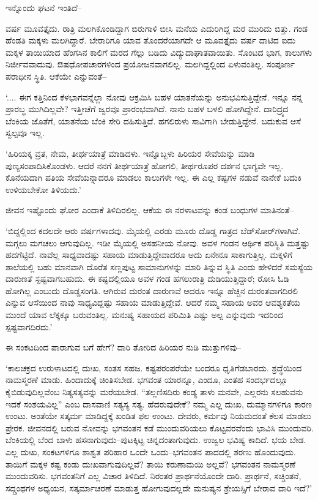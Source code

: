 ಇನ್ನೊಂದು ಘಟನೆ ಇಂತಿದೆ–

\vskip 2pt

ವರ್ಷ ಮೂವತ್ತೈದು. ರಾತ್ರಿ ಮಲಗಿಕೊಂಡಿದ್ದಾಗ ಬಿರುಗಾಳಿ ಬೀಸಿ ಮನೆಯ ಎದುರಿಗಿದ್ದ ಮರ ಮುರಿದು ಬಿತ್ತು. ಗಂಡ ಹೆಂಡತಿ ಮಕ್ಕಳು ಮಲಗಿದ್ದಾರೆ. ಬೇರಾರಿಗೂ ಯಾವ ತೊಂದರೆ\-ಯಾಗದೇ ಆ ಮೂವತ್ತೈದು ವರ್ಷ ದಾಟಿದ ಐದು ಮಕ್ಕಳ ತಾಯಿಯಾದ ಹೆಂಗಸಿನ ಕಾಲಿಗೆ ಮರದ ಗೆಲ್ಲು ಬಡಿದು ವಿದ್ಯುದಾಘಾತವಾಯಿತು. ಸೊಂಟದ ಭಾಗ, ಕಾಲುಗಳು ನಿರ್ಜೀವವಾದುವು. ಔಷಧೋಪಚಾರಗಳಿಂದ ಪ್ರಯೋಜನವಾಗಲಿಲ್ಲ. ಮಲಗಿದ್ದಲ್ಲಿಂದ ಏಳುವಂತಿಲ್ಲ. ಸಂಪೂರ್ಣ ಪರಾಧೀನ ಸ್ಥಿತಿ. ಆಕೆಯೇ ಎನ್ನುವಂತೆ–

\vskip 2pt

‘.... ಈಗ ಕತ್ತಿನಿಂದ ಕೆಳಭಾಗವನ್ನೆಲ್ಲಾ ನೋವು ಆಕ್ರಮಿಸಿ ಬಹಳ ಯಾತನೆಯನ್ನು ಅನುಭವಿಸುತ್ತಿದ್ದೇನೆ. ಇನ್ನೂ ನನ್ನ ಪ್ರಾರಬ್ಧ ಮುಗಿದಿಲ್ಲವೇ? ಇತ್ತೀಚೆಗೆ ಜ್ವರವೂ ಪ್ರಾರಂಭವಾಗಿದೆ. ನಾನು ಬಹಳ ಬಳಲಿ ಹೋಗಿದ್ದೇನೆ. ದಾರಿದ್ರ್ಯದ ಬೆಂಕಿಯ ಜೊತೆಗೆ, ಯಾತನೆಯ ಬೆಂಕಿ ಸೇರಿ ದಹಿಸುತ್ತಿದೆ. ಹಗಲಿರುಳು ಸಾವಿಗಾಗಿ ಬೇಡುತ್ತಿದ್ದೇನೆ. ಬದುಕುವ ಆಸೆ ಸ್ವಲ್ಪವೂ ಇಲ್ಲ.

‘ಹಿರಿಯಕ್ಕ ವ್ರತ, ನೇಮ, ತೀರ್ಥಯಾತ್ರೆ ಮಾಡಿದಳು. ಇನ್ನೊಬ್ಬಳು ಹಿರಿಯರ ಸೇವೆಯನ್ನು ಮಾಡಿ ಪುಣ್ಯಸಂಪಾದಿಸಿಕೊಂಡಳು. ಆದರೆ ನನಗೆ ತೀರ್ಥಯಾತ್ರೆ ಹೋಗಲಿ, ತೀರ್ಥರೂಪರ ದರ್ಶನ ಭಾಗ್ಯವೇ ಇಲ್ಲ. ಕೊನೆಯದಾಗಿ ಪತಿಯ ಸೇವೆಯನ್ನಾದರೂ ಮಾಡಲು ಕಾಲುಗಳೇ ಇಲ್ಲ. ಈ ಎಲ್ಲ ಕಷ್ಟಗಳ ನಡುವೆ ನಾನೇಕೆ ಬದುಕಿ ಉಳಿಯಬೇಕೋ ತಿಳಿಯದು.’

ಜೀವನ ಇಷ್ಟೊಂದು ಘೋರ ಎಂದಾಕೆ ತಿಳಿದಿರಲಿಲ್ಲ. ಆಕೆಯ ಈ ನರಳಾಟವನ್ನು ಕಂಡ ಬಂಧುಗಳ ಮಾತಿನಂತೆ–

‘ಬಿದ್ದಲ್ಲಿಂದ ಕದಲದೇ ಆರು ವರ್ಷಗಳಾದವು. ಮೈಯಲ್ಲಿ ಎರಡು ಮೂರು ದೊಡ್ಡ ಗಾತ್ರದ ಬೆಡ್​ಸೋರ್​ಗಳಾಗಿವೆ. ಮಗ್ಗಲು ಮಗಚಲು ಆಗುವುದಿಲ್ಲ. ಇಡೀ ಮೈಯಲ್ಲಿ ಅಸಹನೀಯ ನೋವು. ಅವಳ ಗಂಡನ ಆರ್ಥಿಕ ಪರಿಸ್ಥಿತಿ ಮತ್ತಷ್ಟು ಹದಗೆಟ್ಟಿದೆ. ನಾವೆಲ್ಲ ಸಾಧ್ಯವಾದಷ್ಟು ಸಹಾಯ ಮಾಡುತ್ತಿದ್ದೇವಾದರೂ ಅದು ಏನೇನೂ ಸಾಕಾಗುತ್ತಿಲ್ಲ. ಮಕ್ಕಳಿಗೆ ಶಾಲೆಯಲ್ಲಿ ಬಹು ಮಾನವಾಗಿ ದೊರೆತ ಸಣ್ಣಪುಟ್ಟ ಸಾಮಾನುಗಳನ್ನು ಮಾರಿ ತಿನ್ನುವ ಸ್ಥಿತಿ ಎಂದು ಹೇಳಿದರೆ ಸಮಸ್ಯೆಯ ದಾರುಣತೆ ಸ್ಪಷ್ಟವಾಗಬಹುದು. ಈ ಕಷ್ಟದಲ್ಲಿಯೂ ಅವಳ ಗಂಡ ಹಗಲುರಾತ್ರಿ ದುಡಿಯುತ್ತಿದ್ದಾರೆ; ರೋಸಿ ಓಡಿ ಹೋಗಿಲ್ಲ ಎಂಬುದು ದೊಡ್ಡಸಂಗತಿ. ಆಗಿರುವ ದುರಂತ ದಾರುಣವೆ ಆದರೂ ಇನ್ನೂ ಹೆಚ್ಚಿನ ದುರಂತವಾಗದಿರಲಿ ಎನ್ನುವ ಆಸೆಯಿಂದ ನಾವು ಸಾಧ್ಯವಿದ್ದಷ್ಟು ಸಹಾಯ ಮಾಡುತ್ತಿದ್ದೇವೆ. ಆದರೆ ನಮ್ಮ ಸಹಾಯ ಅವರ ಆವಶ್ಯಕತೆಯ ಮುಂದೆ ಯಾವ ಲೆಕ್ಕಕ್ಕೂ ಬರುವಂತಿಲ್ಲ. ಮನುಷ್ಯ ಸಹಾಯದ ಪರಿಮಿತಿ ಎಷ್ಟು ಅಲ್ಪ ಎನ್ನುವುದು ಇದರಿಂದ ಸ್ಪಷ್ಟವಾಗದಿರದು.’

ಈ ಸಂಕಟದಿಂದ ಪಾರಾಗುವ ಬಗೆ ಹೇಗೆ? ದಾರಿ ತೋರಿದ ಹಿರಿಯರ ನುಡಿ ಮುತ್ತುಗಳಿವು–

‘ಕಾಲಚಕ್ರದ ಉರುಳಾಟದಲ್ಲಿ ದುಃಖ, ಸಂತಸ ಸಹಜ. ಕಷ್ಟಪರಂಪರೆಯೇ ಬಂದರೂ ಧೃತಿಗೆಡಬಾರದು. ಶ್ರದ್ಧೆಯಿಂದ ನಾಮಸ್ಮರಣೆ ಮಾಡು. ಹಿಂದಾದುಕ್ಕೆ ಚಿಂತಿಸಬೇಡ. ಭಗವಂತ ಯಾರನ್ನೂ, ಎಂದೂ, ಎಂತಹ ಸಂದರ್ಭದಲ್ಲೂ ಕೈಬಿಡುವುದಿಲ್ಲವೆಂಬ ನಿತ್ಯಸತ್ಯವನ್ನು ಮರೆಯ\-ಬೇಡ. “ತಲ್ಲಣಿಸದಿರು ಕಂಡ್ಯ ತಾಳು ಮನವೇ, ಎಲ್ಲರನು ಸಲಹುವನು ಇದಕೆ ಸಂಶಯವಿಲ್ಲ” ಎಂಬ ದಾಸವಾಣಿ ಸತ್ಯಸ್ಯ ಸತ್ಯ. ಹೆದರುವುದೇಕೆ? ನಮ್ಮ ಎಲ್ಲ ದುಃಖ, ದುಮ್ಮಾನಗಳಿಗೂ ಕಾರಣ ಉಂಟು. ಅಂತೆಯೇ ಸತ್ಕರ್ಮ ಮಾಡಿದ್ದಕ್ಕೆ ಖಂಡಿತ ಫಲ ಉಂಟು. ದೇವರು, ಕರ್ಮವು ನಿಯಮದಂತೆ ಕೆಲಸ ಮಾಡಲು ಪ್ರೇರಕ. ಜೀವನದಲ್ಲಿ ಬರುವ ನೋವನ್ನು ಭಗವಂತನ ಕಡೆ ಮುಂದುವರಿಯಲು ಕೊಟ್ಟವರವೆಂದು ಭಾವಿಸಿ ಮುಂದುವರಿ. ಬೆಂಕಿಯಲ್ಲಿ ಬೆಂದ ಬಾಳು ಹಸನಾಗುವುದು–ಪುಟಕ್ಕಿಟ್ಟ ಚಿನ್ನದಂತಾಗುವುದು. ಉಜ್ವಲ ಭವಿಷ್ಯ ಕಾದಿದೆ. ಭಯ ಬೇಡ. ಎಲ್ಲ ದುಃಖ, ಸಂಕಟಗಳಿಗೂ ಶಾಶ್ವತ ಪರಿಹಾರ ಒಂದೇ ಒಂದು–ಭಗವಂತನ ಪಾದದಲ್ಲಿ ಶರಣು ಹೊಂದುವುದು. ತಾಯಿಗೆ ಮಕ್ಕಳ ಕಷ್ಟ ಕಂಡು ದುಃಖವಾಗುವುದಿಲ್ಲವೆ? ತಾಯಿ ಕರುಣಾಮಯಿ ಅಲ್ಲವೆ? ಭಗವಂತನ ನಾಮಸ್ಮರಣೆ ಮುಂದುವರಿಸು. ಭಗವಂತನಿಗೆ ಎಲ್ಲ ವಿಚಾರ ತಿಳಿದಿದೆ. ನಿರಂತರ ಪ್ರಾರ್ಥನೆಯೊಂದೇ ದಾರಿ. ಪ್ರಾರ್ಥನೆ, ಸಚ್ಚಿಂತನೆ, ಸದ್ಗ್ರಂಥಗಳ ಅಧ್ಯಯನ, ಸತ್ಕರ್ಮಾಚರಣೆ ಮಾಡುತ್ತ ಹೋಗುವುದಲ್ಲದೇ ಮನುಷ್ಯನ ಶ್ರೇಯಸ್ಸಿಗೆ ಬೇರಾವ ದಾರಿ ಇದೆ?’

